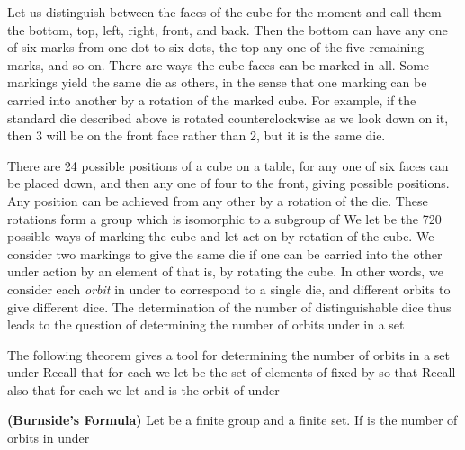 \documentclass[11pt,oneside]{article}
\begin{document}
\begin{BookBody}

Let us distinguish between the faces of the cube for the moment and call them the bottom, top, left, right, front, and back. Then the bottom can have any one of six marks from one dot to six dots, the top any one of the five remaining marks, and so on. There are  ways the cube faces can be marked in all. Some markings yield the same die as others, in the sense that one marking can be carried into another by a rotation of the marked cube. For example, if the standard die described above is rotated  counterclockwise as we look down on it, then 3 will be on the front face rather than 2, but it is the same die.

There are 24 possible positions of a cube on a table, for any one of six faces can be placed down, and then any one of four to the front, giving  possible positions. Any position can be achieved from any other by a rotation of the die. These rotations form a group  which is isomorphic to a subgroup of  We let  be the 720 possible ways of marking the cube and let  act on  by rotation of the cube. We consider two markings to give the same die if one can be carried into the other under action by an element of  that is, by rotating the cube. In other words, we consider each\textit{ orbit} in  under  to correspond to a single die, and different orbits to give different dice. The determination of the number of distinguishable dice thus leads to the question of determining the number of orbits under  in a set 

The following theorem gives a tool for determining the number of orbits in a set  under  Recall that for each  we let  be the set of elements of  fixed by  so that  Recall also that for each  we let   and  is the orbit of  under 

 \textbf{(Burnside’s Formula)} Let  be a finite group and  a finite set. If  is the number of orbits in  under 


\end{BookBody}
\end{document}
